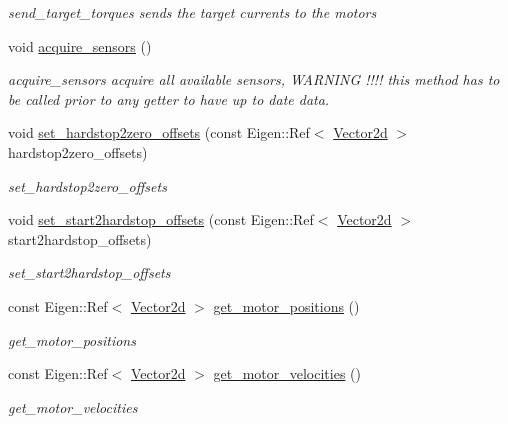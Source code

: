 \begin{DoxyCompactItemize}
\begin{DoxyCompactList}\small\item\em send\+\_\+target\+\_\+torques sends the target currents to the motors \end{DoxyCompactList}\item 
void \hyperlink{classblmc__robots_1_1Stuggihop_a594cb654f63c3ff8fb7718ce7d393d81}{acquire\+\_\+sensors} ()
\begin{DoxyCompactList}\small\item\em acquire\+\_\+sensors acquire all available sensors, W\+A\+R\+N\+I\+NG !!!! this method has to be called prior to any getter to have up to date data. \end{DoxyCompactList}\item 
void \hyperlink{classblmc__robots_1_1Stuggihop_a5f0707d8965fc98b36ca3fa42b57db5f}{set\+\_\+hardstop2zero\+\_\+offsets} (const Eigen\+::\+Ref$<$ \hyperlink{common__header_8hpp_acb6916bc8c9fe9d98c484fd4cc201447}{Vector2d} $>$ hardstop2zero\+\_\+offsets)
\begin{DoxyCompactList}\small\item\em set\+\_\+hardstop2zero\+\_\+offsets \end{DoxyCompactList}\item 
void \hyperlink{classblmc__robots_1_1Stuggihop_afb35c29fd6e5eb97337857fd34532a6d}{set\+\_\+start2hardstop\+\_\+offsets} (const Eigen\+::\+Ref$<$ \hyperlink{common__header_8hpp_acb6916bc8c9fe9d98c484fd4cc201447}{Vector2d} $>$ start2hardstop\+\_\+offsets)
\begin{DoxyCompactList}\small\item\em set\+\_\+start2hardstop\+\_\+offsets \end{DoxyCompactList}\item 
const Eigen\+::\+Ref$<$ \hyperlink{common__header_8hpp_acb6916bc8c9fe9d98c484fd4cc201447}{Vector2d} $>$ \hyperlink{classblmc__robots_1_1Stuggihop_a8d9d32080e9262b319f4f4ce7d85bac1}{get\+\_\+motor\+\_\+positions} ()
\begin{DoxyCompactList}\small\item\em get\+\_\+motor\+\_\+positions \end{DoxyCompactList}\item 
const Eigen\+::\+Ref$<$ \hyperlink{common__header_8hpp_acb6916bc8c9fe9d98c484fd4cc201447}{Vector2d} $>$ \hyperlink{classblmc__robots_1_1Stuggihop_accb7420eaa50dafb84c434623697a272}{get\+\_\+motor\+\_\+velocities} ()
\begin{DoxyCompactList}\small\item\em get\+\_\+motor\+\_\+velocities \end{DoxyCompactList}\item 

\end{DoxyCompactItemize}
